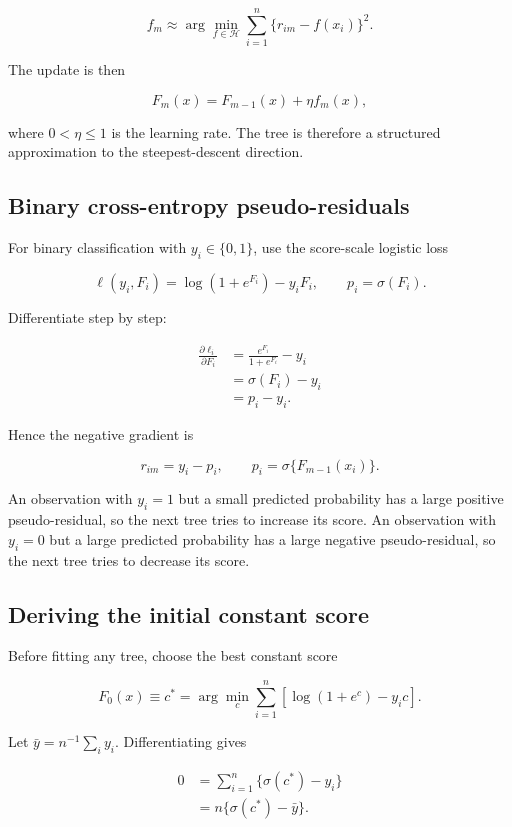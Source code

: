 \documentclass[11pt]{article}
\begin{document}
\[
 f_m\approx
 \arg\min_{f\in\mathcal H}
 \sum_{i=1}^n\{r_{im}-f(x_i)\}^2.
\]

The update is then

\[
 \boxed{F_m(x)=F_{m-1}(x)+\eta f_m(x)},
\]

where $0<\eta\le 1$ is the learning rate. The tree is therefore a structured
approximation to the steepest-descent direction.

\subsection{Binary cross-entropy pseudo-residuals}

For binary classification with $y_i\in\{0,1\}$, use the score-scale logistic
loss

\[
 \ell(y_i,F_i)=\log(1+e^{F_i})-y_iF_i,
 \qquad p_i=\sigma(F_i).
\]

Differentiate step by step:

\begin{align*}
 \frac{\partial\ell_i}{\partial F_i}
 &=\frac{e^{F_i}}{1+e^{F_i}}-y_i\\
 &=\sigma(F_i)-y_i\\
 &=p_i-y_i.
\end{align*}

Hence the negative gradient is

\[
 \boxed{r_{im}=y_i-p_i},
 \qquad p_i=\sigma\{F_{m-1}(x_i)\}.
\]

An observation with $y_i=1$ but a small predicted probability has a large
positive pseudo-residual, so the next tree tries to increase its score. An
observation with $y_i=0$ but a large predicted probability has a large negative
pseudo-residual, so the next tree tries to decrease its score.

\subsection{Deriving the initial constant score}

Before fitting any tree, choose the best constant score

\[
 F_0(x)\equiv c^*
 =\arg\min_c\sum_{i=1}^n
 \left[\log(1+e^c)-y_ic\right].
\]

Let $\bar y=n^{-1}\sum_i y_i$. Differentiating gives

\begin{align*}
 0
 &=\sum_{i=1}^n\{\sigma(c^*)-y_i\}\\
 &=n\{\sigma(c^*)-\bar y\}.
\end{align*}
\end{document}
